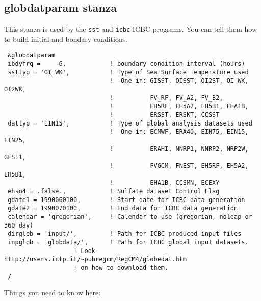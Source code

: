 \subsection{globdatparam stanza}

This stanza is used by the \verb=sst= and \verb=icbc= ICBC programs. You can
tell them how to build initial and bondary conditions.

{\footnotesize
\begin{Verbatim}
 &globdatparam
 ibdyfrq =     6,            ! boundary condition interval (hours)
 ssttyp = 'OI_WK',           ! Type of Sea Surface Temperature used
                             !  One in: GISST, OISST, OI2ST, OI_WK, OI2WK,
                             !          FV_RF, FV_A2, FV_B2,
                             !          EH5RF, EH5A2, EH5B1, EHA1B,
                             !          ERSST, ERSKT, CCSST
 dattyp = 'EIN15',           ! Type of global analysis datasets used
                             !  One in: ECMWF, ERA40, EIN75, EIN15, EIN25,
                             !          ERAHI, NNRP1, NNRP2, NRP2W, GFS11,
                             !          FVGCM, FNEST, EH5RF, EH5A2, EH5B1,
                             !          EHA1B, CCSMN, ECEXY
 ehso4 = .false.,            ! Sulfate dataset Control Flag
 gdate1 = 1990060100,        ! Start date for ICBC data generation
 gdate2 = 1990070100,        ! End data for ICBC data generation
 calendar = 'gregorian',     ! Calendar to use (gregorian, noleap or 360_day)
 dirglob = 'input/',         ! Path for ICBC produced input files
 inpglob = 'globdata/',      ! Path for ICBC global input datasets.
                   ! Look http://users.ictp.it/~pubregcm/RegCM4/globedat.htm
                   ! on how to download them.
 /
\end{Verbatim}
}

Things you need to know here:


